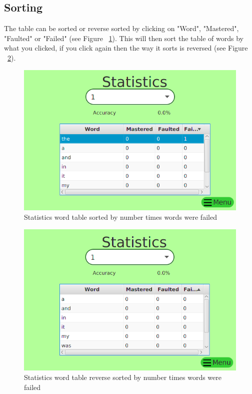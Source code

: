 \documentclass[12pt,a4paper,titlepage,onecolumn]{article}
\begin{document}
		\subsection{Sorting}
		The table can be sorted or reverse sorted by clicking on "Word", "Mastered", "Faulted" or "Failed" (see Figure ~\ref{fig:StatisticsFailedSorted1}). This will then sort the table of words by what you clicked, if you click again then the way it sorts is reversed (see Figure ~\ref{fig:StatisticsFailedSorted2}).
		\begin{figure}[h]
			\centering
			\includegraphics[width=1\linewidth]{Figures/Statistics/StatisticsFailedSorted1}
			\caption[Sorted by Failed]{Statistics word table sorted by number times words were failed}
			\label{fig:StatisticsFailedSorted1}
		\end{figure}
		\begin{figure}[h]
			\centering
			\includegraphics[width=1\linewidth]{Figures/Statistics/StatisticsFailedSorted2}
			\caption[Reverse Sorted by Failed]{Statistics word table reverse sorted by number times words were failed}
			\label{fig:StatisticsFailedSorted2}
		\end{figure}
		
\end{document}
